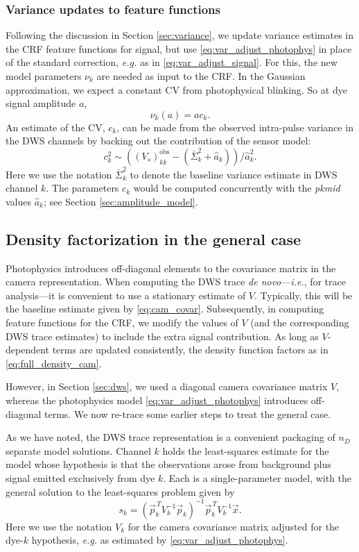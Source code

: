 \documentclass[10pt]{article}
\newcommand{\ie}{\emph{i.e.}}
\newcommand{\eg}{\emph{e.g.}}
\newcommand{\cv}{{\small CV}}
\newcommand{\dws}{{\small DWS}}
\newcommand{\crf}{{\small CRF}}
\begin{document}
\subsubsection{Variance updates to feature functions}
\label{sec:var_update_photophys}
Following the discussion in Section \ref{sec:variance}, we update variance estimates in the \crf{} feature functions for signal, but use \eqref{eq:var_adjust_photophys} in place of the standard correction, \eg{} as in \eqref{eq:var_adjust_signal}. 
For this, the new model parameters $\nu_k$ are needed as input to the \crf.  In the Gaussian approximation, we expect a constant \cv{} from photophysical blinking. So at dye signal amplitude $a$,
\begin{equation}
\label{eq:blink_std_model}
\nu_k(a) = a c_k.
\end{equation}
An estimate of the \cv{}, $c_k$, can be made from the observed intra-pulse variance in the \dws{} channels by backing out the  contribution of the sensor model:
$$
c_k^2 \sim ((V_s)_{kk}^{\text{obs}} - (\bar{\Sigma}_k^2 + \hat{a}_k))/\hat{a}_k^2.
$$
Here we use the notation $\bar{\Sigma}_k^2$ to denote the baseline variance estimate in \dws{} channel $k$. 
The parameters $c_k$ would be computed concurrently with the \emph{pkmid} values $\hat{a}_k$; see Section \ref{sec:amplitude_model}.

\subsection{Density factorization in the general case}
\label{sec:density_general}
Photophysics introduces off-diagonal elements to the covariance matrix in the camera representation.
When computing the \dws{} trace \emph{de novo}---\ie, for trace analysis---it is convenient to use a stationary estimate of $V$.
Typically, this will be the baseline estimate given by \eqref{eq:cam_covar}.
Subsequently, in computing feature functions for the \crf{}, we modify the values of $V$ (and the corresponding \dws{} trace estimates) to include the extra signal contribution.
As long as $V$-dependent terms are updated consistently, the density function factors as in \eqref{eq:full_density_cam}.

However, in Section \ref{sec:dws}, we used a diagonal camera covariance matrix $V$, whereas the photophysics model \eqref{eq:var_adjust_photophys} introduces off-diagonal terms.
We now re-trace some earlier steps to treat the general case.

As we have noted, the \dws{} trace representation is a convenient packaging of $n_D$ separate model solutions.
Channel $k$ holds the least-squares estimate for the model whose hypothesis is that the observations arose from background plus signal emitted exclusively from dye $k$.
Each is a single-parameter model, with the general solution to the least-squares problem given by~\cite{Lupton1993}
\begin{equation}
\label{eq:dws_general}
s_k = (\vec{p}_k^{\,T} V_k^{-1} \vec{p}_k)^{-1} \vec{p}_k^{\,T} V_k^{-1} \vec{x}.
\end{equation}
Here we use the notation $V_k$ for the camera covariance matrix adjusted for the dye-$k$ hypothesis, \eg{} as estimated by \eqref{eq:var_adjust_photophys}.
\end{document}
